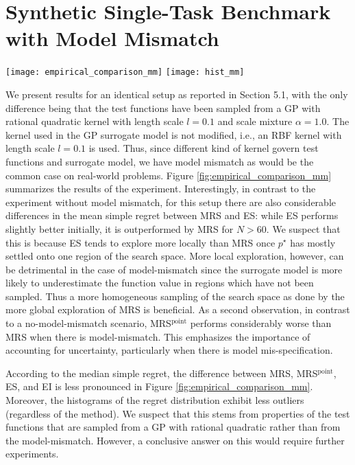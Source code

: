 
\section{Synthetic Single-Task Benchmark with Model Mismatch}

\begin{figure*}
\centering
\texttt{[image: empirical\_comparison\_mm]}
\texttt{[image: hist\_mm]}
\caption{(Top) Median and mean simple regret over $250$ repetitions for different acquisition functions. Shown is the simple regret of the recommendation $\mathbf{\tilde x}_N$ after $N$ trials, i.e., the point which maximizes the GP posterior
mean. (Bottom) Histogram of the simple regret after performing $N=100$ trials for different acquisition functions (note the log-scales).}
\label{fig:empirical_comparison_mm}
\end{figure*}

We present results for an identical setup as reported in Section 5.1, with the
only difference being that the test functions have been sampled from a GP with
rational quadratic kernel with length scale $l=0.1$ and scale mixture
$\alpha=1.0$. The kernel used in the GP surrogate model is not modified, i.e.,
an RBF kernel with length scale $l=0.1$ is used. Thus, since different kind of
kernel govern test functions and surrogate model, we have model mismatch as
would be the common case on real-world problems. Figure
\ref{fig:empirical_comparison_mm} summarizes the results of the experiment.
Interestingly, in contrast to the experiment without model mismatch, for this setup
there are also considerable differences in the mean simple regret between MRS
and ES: while ES performs slightly better initially, it is outperformed by MRS
for $N > 60$. We suspect that this is because ES tends to explore more locally
than MRS once $p^\star$ has mostly settled onto one region of the search
space. More local exploration, however, can be detrimental in the case of
model-mismatch since the surrogate model is more likely to underestimate the
function value in regions which have not been sampled. Thus a more homogeneous
sampling of the search space as done by the more global exploration of MRS is
beneficial. As a second observation, in contrast to a no-model-mismatch
scenario, MRS$^\text{point}$ performs considerably worse than MRS when there
is model-mismatch. This emphasizes the importance of accounting for
uncertainty, particularly when there is model mis-specification.

According to the median simple regret, the difference between MRS,
MRS$^\text{point}$, ES, and EI is less pronounced in Figure
\ref{fig:empirical_comparison_mm}. Moreover, the histograms of the regret
distribution exhibit less outliers (regardless of the method). We suspect that
this stems from properties of the test functions that are sampled from a GP
with rational quadratic rather than from the model-mismatch. However,
a conclusive answer on this would require further experiments.

